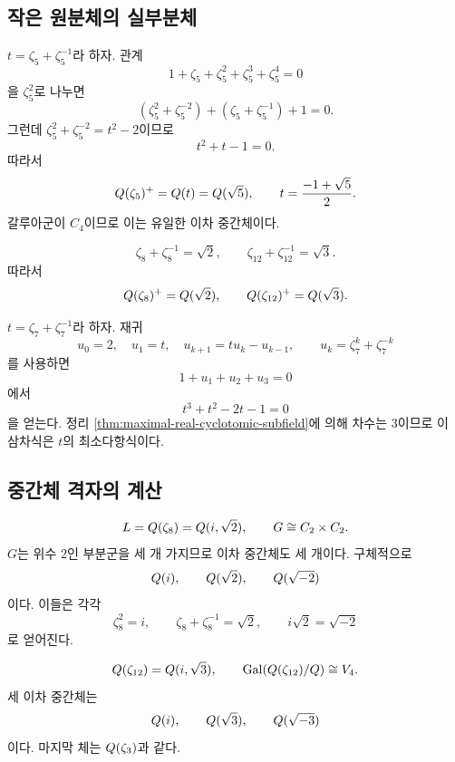 \subsection{작은 원분체의 실부분체}

\begin{example}[$5$차 원분체]
$t=\zeta_5+\zeta_5^{-1}$라 하자. 관계
\[
  1+\zeta_5+\zeta_5^2+\zeta_5^3+\zeta_5^4=0
\]
을 $\zeta_5^2$로 나누면
\[
  (\zeta_5^2+\zeta_5^{-2})
  +(\zeta_5+\zeta_5^{-1})+1=0.
\]
그런데 $\zeta_5^2+\zeta_5^{-2}=t^2-2$이므로
\[
  t^2+t-1=0.
\]
따라서
\[
  Q(\zeta_5)^+=Q(t)=Q(\sqrt5),
  \qquad
  t=\frac{-1+\sqrt5}{2}.
\]
갈루아군이 $C_4$이므로 이는 유일한 이차 중간체이다.
\end{example}

\begin{example}[$8$차와 $12$차 원분체]
\[
  \zeta_8+\zeta_8^{-1}=\sqrt2,
  \qquad
  \zeta_{12}+\zeta_{12}^{-1}=\sqrt3.
\]
따라서
\[
  Q(\zeta_8)^+=Q(\sqrt2),
  \qquad
  Q(\zeta_{12})^+=Q(\sqrt3).
\]
\end{example}

\begin{example}
$t=\zeta_7+\zeta_7^{-1}$라 하자. 재귀
\[
  u_0=2,\quad u_1=t,\quad
  u_{k+1}=tu_k-u_{k-1},
  \qquad
  u_k=\zeta_7^k+\zeta_7^{-k}
\]
를 사용하면
\[
  1+u_1+u_2+u_3=0
\]
에서
\[
  t^3+t^2-2t-1=0
\]
을 얻는다. 정리 \ref{thm:maximal-real-cyclotomic-subfield}에 의해 차수는 $3$이므로 이 삼차식은 $t$의 최소다항식이다.
\end{example}

\subsection{중간체 격자의 계산}

\begin{example}
\[
  L=Q(\zeta_8)=Q(i,\sqrt2),
  \qquad
  G\cong C_2\times C_2.
\]
$G$는 위수 $2$인 부분군을 세 개 가지므로 이차 중간체도 세 개이다. 구체적으로
\[
  Q(i),\qquad
  Q(\sqrt2),\qquad
  Q(\sqrt{-2})
\]
이다. 이들은 각각
\[
  \zeta_8^2=i,
  \qquad
  \zeta_8+\zeta_8^{-1}=\sqrt2,
  \qquad
  i\sqrt2=\sqrt{-2}
\]
로 얻어진다.
\end{example}

\begin{example}[$12$차 원분체]
\[
  Q(\zeta_{12})=Q(i,\sqrt3),
  \qquad
  \operatorname{Gal}(Q(\zeta_{12})/Q)\cong V_4.
\]
세 이차 중간체는
\[
  Q(i),\qquad
  Q(\sqrt3),\qquad
  Q(\sqrt{-3})
\]
이다. 마지막 체는 $Q(\zeta_3)$과 같다.
\end{example}

